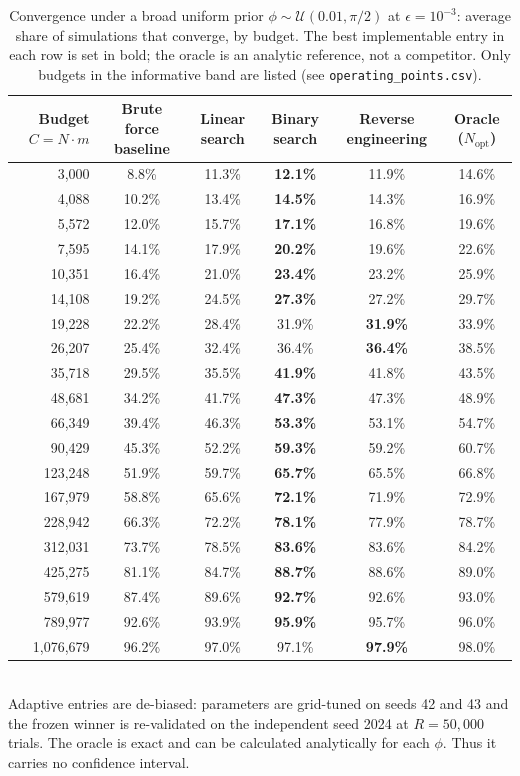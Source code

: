 \begin{table}[ht]
\centering
\small
\caption{Convergence under a broad uniform prior $\phi\sim\mathcal{U}(0.01,\pi/2)$ at $\epsilon=10^{-3}$: average share of simulations that converge, by budget. The best implementable entry in each row is set in bold; the oracle is an analytic reference, not a competitor. Only budgets in the informative band are listed (see \texttt{operating\_points.csv}).}
\label{tab:broad-pi2}
\begin{tabular}{rccccc}
\toprule
Budget $C=N\cdot m$
& Brute force baseline
& Linear search
& Binary search
& Reverse engineering
& Oracle ($N_\text{opt}$) \\
\midrule
3{,}000
& 8.8\%
& 11.3\%
& \textbf{12.1\%}
& 11.9\%
& 14.6\% \\
4{,}088
& 10.2\%
& 13.4\%
& \textbf{14.5\%}
& 14.3\%
& 16.9\% \\
5{,}572
& 12.0\%
& 15.7\%
& \textbf{17.1\%}
& 16.8\%
& 19.6\% \\
7{,}595
& 14.1\%
& 17.9\%
& \textbf{20.2\%}
& 19.6\%
& 22.6\% \\
10{,}351
& 16.4\%
& 21.0\%
& \textbf{23.4\%}
& 23.2\%
& 25.9\% \\
14{,}108
& 19.2\%
& 24.5\%
& \textbf{27.3\%}
& 27.2\%
& 29.7\% \\
19{,}228
& 22.2\%
& 28.4\%
& 31.9\%
& \textbf{31.9\%}
& 33.9\% \\
26{,}207
& 25.4\%
& 32.4\%
& 36.4\%
& \textbf{36.4\%}
& 38.5\% \\
35{,}718
& 29.5\%
& 35.5\%
& \textbf{41.9\%}
& 41.8\%
& 43.5\% \\
48{,}681
& 34.2\%
& 41.7\%
& \textbf{47.3\%}
& 47.3\%
& 48.9\% \\
66{,}349
& 39.4\%
& 46.3\%
& \textbf{53.3\%}
& 53.1\%
& 54.7\% \\
90{,}429
& 45.3\%
& 52.2\%
& \textbf{59.3\%}
& 59.2\%
& 60.7\% \\
123{,}248
& 51.9\%
& 59.7\%
& \textbf{65.7\%}
& 65.5\%
& 66.8\% \\
167{,}979
& 58.8\%
& 65.6\%
& \textbf{72.1\%}
& 71.9\%
& 72.9\% \\
228{,}942
& 66.3\%
& 72.2\%
& \textbf{78.1\%}
& 77.9\%
& 78.7\% \\
312{,}031
& 73.7\%
& 78.5\%
& \textbf{83.6\%}
& 83.6\%
& 84.2\% \\
425{,}275
& 81.1\%
& 84.7\%
& \textbf{88.7\%}
& 88.6\%
& 89.0\% \\
579{,}619
& 87.4\%
& 89.6\%
& \textbf{92.7\%}
& 92.6\%
& 93.0\% \\
789{,}977
& 92.6\%
& 93.9\%
& \textbf{95.9\%}
& 95.7\%
& 96.0\% \\
1{,}076{,}679
& 96.2\%
& 97.0\%
& 97.1\%
& \textbf{97.9\%}
& 98.0\% \\
\bottomrule
\end{tabular}
\\[2pt]
\footnotesize Adaptive entries are de-biased: parameters are grid-tuned on seeds 42 and 43 and the frozen winner is re-validated on the independent seed 2024 at $R=50{,}000$ trials. The oracle is exact and can be calculated analytically for each $\phi$. Thus it carries no confidence interval.
\end{table}
